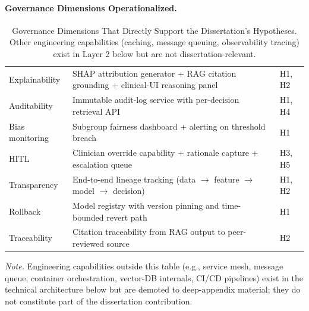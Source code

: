 \paragraph{Governance Dimensions Operationalized.}




{\tablestripes\tablefontsize
{}
\begin{xltabular}{\textwidth}{@{} >{\raggedright\arraybackslash}p{4.0cm} p{9.3cm} >{\centering\arraybackslash}p{1.0cm} @{}}
\caption[Governance Dimensions Operationalized]{Governance Dimensions That Directly Support the Dissertation's Hypotheses. Other engineering capabilities (caching, message queuing, observability tracing) exist in Layer 2 below but are not dissertation-relevant.}\label{tab:appo_gov_dimensions} \\
\toprule
{} &  &  \\
\midrule
\endfirsthead
\endhead
\bottomrule
\endlastfoot
Explainability    & SHAP attribution generator + RAG citation grounding + clinical-UI reasoning panel   & H1, H2 \\
Auditability      & Immutable audit-log service with per-decision retrieval API                          & H1, H4 \\
Bias monitoring   & Subgroup fairness dashboard + alerting on threshold breach                          & H1 \\
HITL              & Clinician override capability + rationale capture + escalation queue                & H3, H5 \\
Transparency      & End-to-end lineage tracking (data $\to$ feature $\to$ model $\to$ decision)         & H1, H2 \\
Rollback          & Model registry with version pinning and time-bounded revert path                    & H1 \\
Traceability      & Citation traceability from RAG output to peer-reviewed source                        & H2 \\
\end{xltabular}}
\vspace{0.4em}
\noindent\textit{Note.} Engineering capabilities outside this table (e.g., service mesh, message queue, container orchestration, vector-DB internals, CI/CD pipelines) exist in the technical architecture below but are demoted to deep-appendix material; they do not constitute part of the dissertation contribution.

